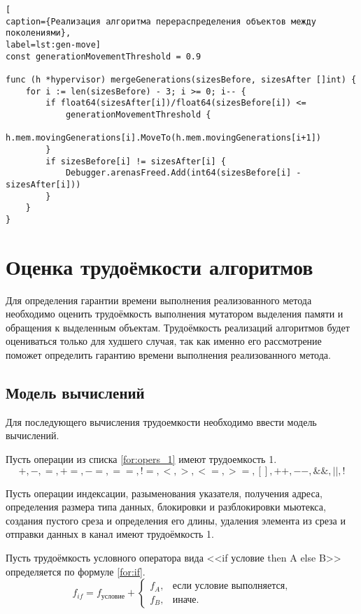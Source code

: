\begin{lstlisting}[
caption={Реализация алгоритма перераспределения объектов между поколениями},
label=lst:gen-move]
const generationMovementThreshold = 0.9

func (h *hypervisor) mergeGenerations(sizesBefore, sizesAfter []int) {
	for i := len(sizesBefore) - 3; i >= 0; i-- {
		if float64(sizesAfter[i])/float64(sizesBefore[i]) <=
			generationMovementThreshold {
			h.mem.movingGenerations[i].MoveTo(h.mem.movingGenerations[i+1])
		}
		if sizesBefore[i] != sizesAfter[i] {
			Debugger.arenasFreed.Add(int64(sizesBefore[i] - sizesAfter[i]))
		}
	}
}
\end{lstlisting}


\section*{Оценка трудоёмкости алгоритмов}

Для определения гарантии времени выполнения реализованного метода необходимо оценить трудоёмкость выполнения мутатором выделения памяти и обращения к выделенным объектам. Трудоёмкость реализаций алгоритмов будет оцениваться только для худшего случая, так как именно его рассмотрение поможет определить гарантию времени выполнения реализованного метода.

\subsection*{Модель вычислений}

Для последующего вычисления трудоемкости необходимо ввести модель вычислений.

Пусть операции из списка \ref{for:opers_1} имеют трудоемкость 1.
\begin{equation}
	\label{for:opers_1}
	+, -, =, +=, -=, ==, !=, <, >, <=, >=, [], ++, {-}-, \&\&, ||, !
\end{equation}

Пусть операции индексации, разыменования указателя, получения адреса, определения размера типа данных, блокировки и разблокировки мьютекса, создания пустого среза и определения его длины, удаления элемента из среза и отправки данных в канал имеют трудоёмкость 1.
	
Пусть трудоёмкость условного оператора вида <<if условие then A else B>> определяется по формуле \ref{for:if}.
\begin{equation}
	\label{for:if}
	f_{if} = f_{\text{условие}} +
	\begin{cases}
		f_A, & \text{если условие выполняется,}\\
		f_B, & \text{иначе.}
	\end{cases}
\end{equation}

